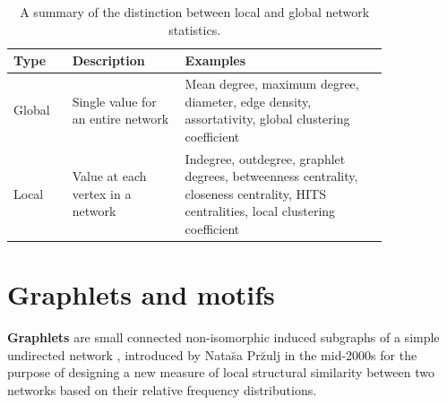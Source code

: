 \documentclass[12pt]{thesis}
\theoremstyle{plain}
\theoremstyle{definition}
\theoremstyle{remark}
\begin{document}
\begin{table}[!t]
\renewcommand{\arraystretch}{1.5}
\centering
\begin{tabular}{L{0.13\linewidth}L{0.25\linewidth}L{0.45\linewidth}}
\hline
\textbf{Type} & \textbf{Description} & \textbf{Examples} \\ \hline
Global & Single value for an entire network & Mean degree, maximum degree, diameter, edge density, assortativity, global clustering coefficient \\ 
Local & Value at each vertex in a network & Indegree, outdegree, graphlet degrees, betweenness centrality, closeness centrality, HITS centralities, local clustering coefficient  \\
\hline
\end{tabular}
\caption{A summary of the distinction between local and global network statistics.}
\label{tab:local_vs_global_statistics}
\end{table}









\section{Graphlets and motifs}

\textbf{Graphlets} are small connected non-isomorphic induced subgraphs of a simple undirected network \cite{Przulj_2007}, introduced by Nata\u{s}a Pr\u{z}ulj in the mid-2000s for the purpose of designing a new measure of local structural similarity between two networks based on their relative frequency distributions.
\end{document}
